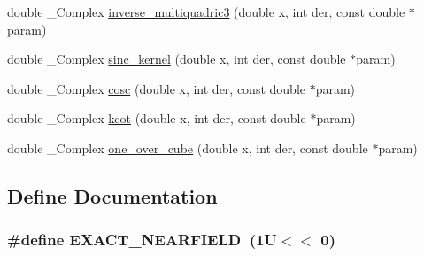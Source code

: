 \begin{CompactItemize}
\item 
\hypertarget{group__applications__fastsum_g221604ef3a42dc2de4f1ce68831e7524}{
double \_\-Complex \hyperlink{group__applications__fastsum_g221604ef3a42dc2de4f1ce68831e7524}{inverse\_\-multiquadric3} (double x, int der, const double $\ast$param)}
\label{group__applications__fastsum_g221604ef3a42dc2de4f1ce68831e7524}

\item 
\hypertarget{group__applications__fastsum_g8946fd3f992262c24477b56cba844873}{
double \_\-Complex \hyperlink{group__applications__fastsum_g8946fd3f992262c24477b56cba844873}{sinc\_\-kernel} (double x, int der, const double $\ast$param)}
\label{group__applications__fastsum_g8946fd3f992262c24477b56cba844873}

\item 
\hypertarget{group__applications__fastsum_gb7b7015bc5f2946583e7adbecb2cf630}{
double \_\-Complex \hyperlink{group__applications__fastsum_gb7b7015bc5f2946583e7adbecb2cf630}{cosc} (double x, int der, const double $\ast$param)}
\label{group__applications__fastsum_gb7b7015bc5f2946583e7adbecb2cf630}

\item 
\hypertarget{group__applications__fastsum_gc693b76a84e9435efc06c1ef26fc7435}{
double \_\-Complex \hyperlink{group__applications__fastsum_gc693b76a84e9435efc06c1ef26fc7435}{kcot} (double x, int der, const double $\ast$param)}
\label{group__applications__fastsum_gc693b76a84e9435efc06c1ef26fc7435}

\item 
\hypertarget{group__applications__fastsum_g1deb0e10a0d6cf7f11d8b90ee008eb53}{
double \_\-Complex \hyperlink{group__applications__fastsum_g1deb0e10a0d6cf7f11d8b90ee008eb53}{one\_\-over\_\-cube} (double x, int der, const double $\ast$param)}
\label{group__applications__fastsum_g1deb0e10a0d6cf7f11d8b90ee008eb53}

\end{CompactItemize}


\subsection{Define Documentation}
\hypertarget{group__applications__fastsum_gc22376cb30edef9131c592a355d1030d}{
\subsubsection{\setlength{\rightskip}{0pt plus 5cm}\#define EXACT\_\-NEARFIELD~(1U$<$$<$ 0)}}
\label{group__applications__fastsum_gc22376cb30edef9131c592a355d1030d}


